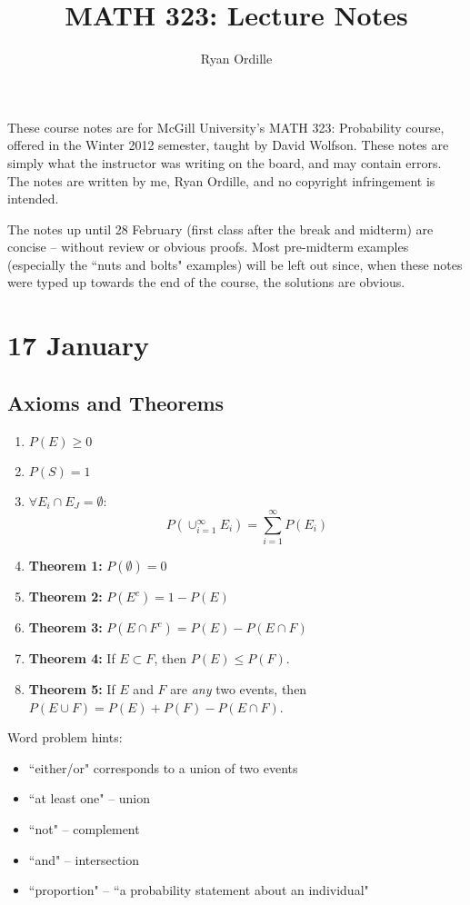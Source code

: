 \documentclass[12pt]{article}
\title{MATH 323: Lecture Notes}
\author{Ryan Ordille}
\begin{document}
\maketitle
\date{}

\pagestyle{myheadings}
These course notes are for McGill University's MATH 323: Probability course, offered in the Winter 2012 semester, taught by David Wolfson. These notes are simply what the instructor was writing on the board, and may contain errors. The notes are written by me, Ryan Ordille, and no copyright infringement is intended. 

The notes up until 28 February (first class after the break and midterm) are concise -- without review or obvious proofs. Most pre-midterm examples (especially the ``nuts and bolts" examples) will be left out since, when these notes were typed up towards the end of the course, the solutions are obvious.



\section{17 January}
\subsection{Axioms and Theorems}
\begin{enumerate}
    \item $P(E) \geq 0$
    \item $P(S) = 1$
    \item $\forall E_i \cap E_J = \emptyset$:
        \[
            P(\cup_{i=1}^{\infty} E_i) = \sum_{i=1}^{\infty} P(E_i)
        \]
    \item \textbf{Theorem 1:} $P(\emptyset) = 0$
    \item \textbf{Theorem 2:} $P(E^c) = 1 - P(E)$
    \item \textbf{Theorem 3:} $P(E \cap F^c) = P(E) - P(E \cap F)$
    \item \textbf{Theorem 4:} If $E \subset F$, then $P(E) \leq P(F)$.
    \item \textbf{Theorem 5:} If $E$ and $F$ are \emph{any} two events, then $P(E \cup F) = P(E) + P(F) - P(E \cap F)$.
\end{enumerate}

Word problem hints:
\begin{itemize}
    \item ``either/or" corresponds to a union of two events
    \item ``at least one" -- union
    \item ``not" -- complement
    \item ``and" -- intersection
    \item ``proportion" -- ``a probability statement about an individual"
\end{itemize}
\end{document}
